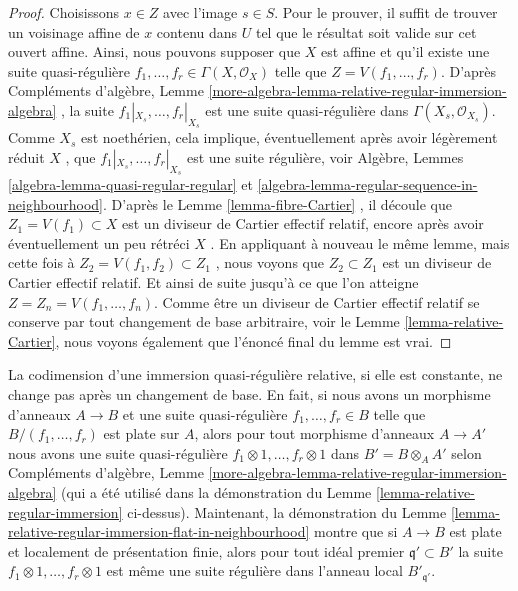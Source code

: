 \begin{proof}
Choisissons  $x \in Z$  avec l'image  $s \in S$. Pour le prouver, il suffit de
trouver un voisinage affine de  $x$  contenu dans  $U$  tel que le
résultat soit valide sur cet ouvert affine. Ainsi, nous pouvons supposer que
 $X$  est affine et qu'il existe une suite quasi-régulière  $f_1, \ldots, f_r \in \Gamma(X, \mathcal{O}_X)$ 
telle que  $Z = V(f_1, \ldots, f_r)$. D'après Compléments d'algèbre, Lemme  \ref{more-algebra-lemma-relative-regular-immersion-algebra} , la suite
 $f_1|_{X_s}, \ldots, f_r|_{X_s}$  est une suite quasi-régulière dans  $\Gamma(X_s, \mathcal{O}_{X_s})$. Comme  $X_s$ 
est noethérien, cela implique, éventuellement après avoir légèrement réduit
 $X$ , que  $f_1|_{X_s}, \ldots, f_r|_{X_s}$  est une suite régulière, voir Algèbre, Lemmes
 \ref{algebra-lemma-quasi-regular-regular}  et  \ref{algebra-lemma-regular-sequence-in-neighbourhood}. D'après le Lemme  \ref{lemma-fibre-Cartier} , il découle que
 $Z_1 = V(f_1) \subset X$  est un diviseur de Cartier effectif relatif, encore après avoir
éventuellement un peu rétréci  $X$ . En appliquant à nouveau le même lemme,
mais cette fois à  $Z_2 = V(f_1, f_2) \subset Z_1$ , nous voyons que  $Z_2 \subset Z_1$  est un diviseur de
Cartier effectif relatif. Et ainsi de suite jusqu'à ce que l'on atteigne
 $Z = Z_n = V(f_1, \ldots, f_n)$. Comme être un diviseur de Cartier effectif relatif se conserve par
tout changement de base arbitraire, voir le Lemme  \ref{lemma-relative-Cartier}, nous voyons
également que l'énoncé final du lemme est vrai.
\end{proof}

\begin{remark}
\label{remark-relative-regular-immersion-elements}
La codimension d'une immersion quasi-régulière relative, si elle est constante, ne
change pas après un changement de base. En fait, si nous avons un morphisme
d'anneaux  $A \to B$  et une suite quasi-régulière  $f_1, \ldots, f_r \in B$  telle que
 $B/(f_1, \ldots, f_r)$  est plate sur  $A$, alors pour tout morphisme d'anneaux
 $A \to A'$  nous avons une suite quasi-régulière  $f_1 \otimes 1, \ldots, f_r \otimes 1$  dans  $B' = B \otimes_A A'$ 
selon Compléments d'algèbre, Lemme  \ref{more-algebra-lemma-relative-regular-immersion-algebra}  (qui a été utilisé dans la démonstration
du Lemme  \ref{lemma-relative-regular-immersion}  ci-dessus). Maintenant, la démonstration du Lemme
 \ref{lemma-relative-regular-immersion-flat-in-neighbourhood}  montre que si  $A \to B$  est plate et localement de présentation
finie, alors pour tout idéal premier  $\mathfrak q' \subset B'$  la suite  $f_1 \otimes 1, \ldots, f_r \otimes 1$  est même
une suite régulière dans l'anneau local  $B'_{\mathfrak q'}$.
\end{remark}

